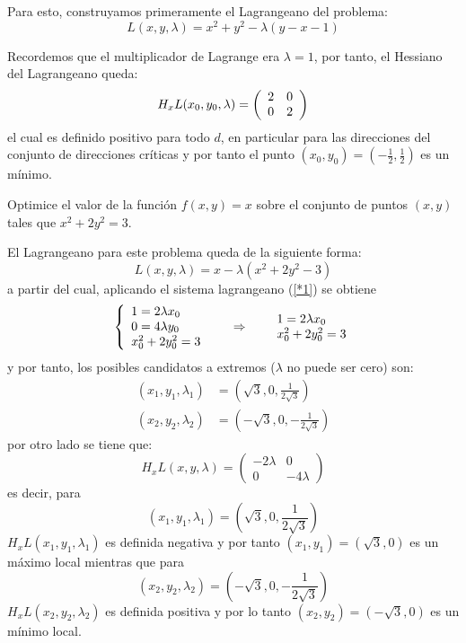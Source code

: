 \begin{solucion}
Para esto, construyamos primeramente el Lagrangeano del problema:%
$$L(x,y,\lambda) = x^{2}+y^{2}-\lambda(y-x-1)$$

Recordemos que el multiplicador de Lagrange era $\lambda=1$, por tanto, el
Hessiano del Lagrangeano queda:%
\[
H_{x}L(x_{0},y_{0},\lambda)=\left(
\begin{array}
[c]{ll}%
2 & 0\\
0 & 2
\end{array}
\right)
\]
el cual es definido positivo para todo $d$, en particular para las direcciones
del conjunto de direcciones cr\'iticas y por tanto el punto $(x_{0}%
,y_{0})=(-\frac{1}{2},\frac{1}{2})$ es un m\'inimo.
\end{solucion}

\begin{ejemplo}
Optimice el valor de la funci\'on $f(x,y)=x$ sobre el conjunto de puntos
$(x,y)$ tales que $x^{2}+2y^{2}=3$.
\end{ejemplo}

\begin{solucion}
El Lagrangeano para este problema queda de la siguiente forma:%
\[
L(x,y,\lambda)=x-\lambda(x^{2}+2y^{2}-3)
\]
a partir del cual, aplicando el sistema lagrangeano (\ref{*1}) se obtiene
\[%
\begin{array}
[c]{lllll}%
\left\{
\begin{array}
[c]{l}%
1=2\lambda x_0 \\
0=4\lambda y_0 \\
x_0^{2}+2y_0^{2} = 3
\end{array}
\right.   & \quad\Rightarrow\quad &
\begin{array}
[c]{l}%
1=2\lambda x_0 \\
x_0^{2}+2y_0^{2} = 3
\end{array}
\end{array}
\]
y por tanto, los posibles candidatos a extremos ($\lambda$ no puede ser cero)
son:%
\begin{align*}
(x_{1},y_{1},\lambda_{1})  & =\left(  \sqrt{3},0,\frac{1}{2\sqrt{3}}\right)
\\
(x_{2},y_{2},\lambda_{2})  & =\left(  -\sqrt{3},0,-\frac{1}{2\sqrt{3}%
}\right)
\end{align*}
por otro lado se tiene que:
\[H_{x}L(x,y,\lambda)=
\begin{pmatrix}
-2 \lambda & 0 \\
0 & -4 \lambda
\end{pmatrix}\]
es decir, para $$(x_{1},y_{1},\lambda_{1})=\left(\sqrt{3},0,\frac{1}{2\sqrt{3}}\right)$$ $H_{x}L(x_{1},y_{1},\lambda_{1})$ es definida negativa y
por tanto $(x_{1},y_{1})=(\sqrt{3},0)$ es un m\'aximo local mientras que para $$(x_{2},y_{2},\lambda_{2})=\left(-\sqrt{3},0,-\frac{1}{2\sqrt{3}}\right)$$ $H_{x}L(x_{2},y_{2},\lambda_{2})$ es definida positiva  y por lo
tanto $(x_{2},y_{2})=(-\sqrt{3},0)$ es un m\'inimo local.
\end{solucion}

